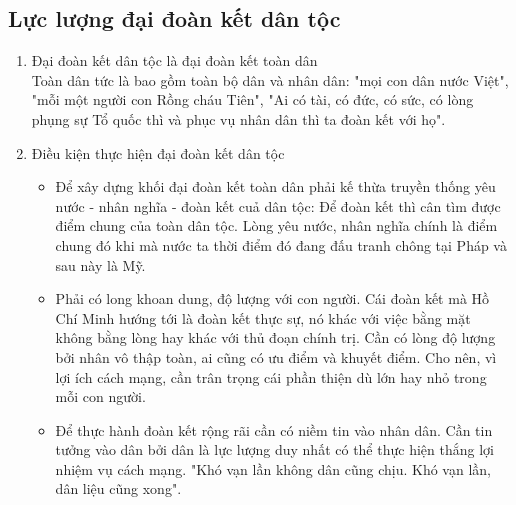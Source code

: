 \documentclass{article}
\begin{document}
	\subsection{Lực lượng đại đoàn kết dân tộc}
	\begin{enumerate}
		\item Đại đoàn kết dân tộc là đại đoàn kết toàn dân\\
		Toàn dân tức là bao gồm toàn bộ dân và nhân dân: "mọi con dân nước Việt", "mỗi một người con Rồng cháu Tiên", "Ai có tài, có đức, có sức, có lòng phụng sự Tổ quốc thì và phục vụ nhân dân thì ta đoàn kết với họ".
		\item Điều kiện thực hiện đại đoàn kết dân tộc
		\begin{itemize}
			\item Để xây dựng khối đại đoàn kết toàn dân phải kế thừa truyền thống yêu nước - nhân nghĩa - đoàn kết cuả dân tộc: Để đoàn kết thì cân tìm được điểm chung của toàn dân tộc. Lòng yêu nước, nhân nghĩa chính là điểm chung đó khi mà nước ta thời điểm đó đang đấu tranh chông tại Pháp và sau này là Mỹ.
			\item Phải có long khoan dung, độ lượng với con người. Cái đoàn kết mà Hồ Chí Minh hướng tới là đoàn kết thực sự, nó khác với việc bằng mặt không bằng lòng hay khác với thủ đoạn chính trị. Cần có lòng độ lượng bởi nhân vô thập toàn, ai cũng có ưu điểm và khuyết điểm. Cho nên, vì lợi ích cách mạng, cần trân trọng cái phần thiện dù lớn hay nhỏ trong mỗi con người.
			\item Để thực hành đoàn kết rộng rãi cần có niềm tin vào nhân dân. Cần tin tưởng vào dân bởi dân là lực lượng duy nhất có thể thực hiện thắng lợi nhiệm vụ cách mạng. "Khó vạn lần không dân cũng chịu. Khó vạn lần, dân liệu cũng xong".
		\end{itemize}
	\end{enumerate}
\end{document}
